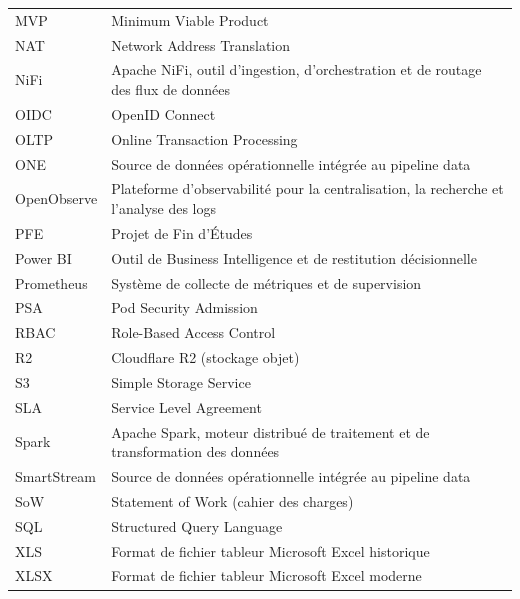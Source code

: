 \begin{longtable}{@{}p{}p{}@{}}
MVP & Minimum Viable Product \\
NAT & Network Address Translation \\
NiFi & Apache NiFi, outil d'ingestion, d'orchestration et de routage des flux de données \\
OIDC & OpenID Connect \\
OLTP & Online Transaction Processing \\
ONE & Source de données opérationnelle intégrée au pipeline data \\
OpenObserve & Plateforme d'observabilité pour la centralisation, la recherche et l'analyse des logs \\
PFE & Projet de Fin d'Études \\
Power BI & Outil de Business Intelligence et de restitution décisionnelle \\
Prometheus & Système de collecte de métriques et de supervision \\
PSA & Pod Security Admission \\
RBAC & Role-Based Access Control \\
R2 & Cloudflare R2 (stockage objet) \\
S3 & Simple Storage Service \\
SLA & Service Level Agreement \\
Spark & Apache Spark, moteur distribué de traitement et de transformation des données \\
SmartStream & Source de données opérationnelle intégrée au pipeline data \\
SoW & Statement of Work (cahier des charges) \\
SQL & Structured Query Language \\
XLS & Format de fichier tableur Microsoft Excel historique \\
XLSX & Format de fichier tableur Microsoft Excel moderne \\
\bottomrule
\end{longtable}
\endgroup

\clearpage
